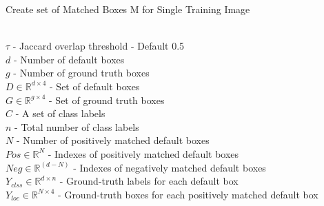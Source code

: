 \documentclass[conference]{IEEEtran}
\begin{document}
\begin{algorithm}
   \caption{Create set of Matched Boxes M for Single Training Image }
   \label{alg2}
\begin{algorithmic}
   		\\$\tau$ - Jaccard overlap threshold - Default 0.5
        \\$d$ - Number of default boxes
        \\$g$ - Number of ground truth boxes
        \\$D \in \mathbb{R}^{d\times4}$ - Set of default boxes
        \\$G \in \mathbb{R}^{g\times4}$  - Set of ground truth boxes
        \\$C$ - A set of class labels 
        \\$n$ - Total number of class labels
    	\\$N$ - Number of positively matched default boxes
    	\\$Pos \in \mathbb{R}^{N}$  - Indexes of positively matched default boxes
        \\$Neg \in \mathbb{R}^{(d - N)}$ - Indexes of negatively matched default boxes
    	\\$Y_{clss} \in \mathbb{R}^{d \times n}$ - Ground-truth labels for each default box
        \\$Y_{loc} \in \mathbb{R}^{N \times 4}$ - Ground-truth boxes for each positively matched default box
                    \ELSE
                    \ENDIF
                  \ENDFOR
            \ENDFOR
\end{algorithmic}
\end{algorithm}
\end{document}
